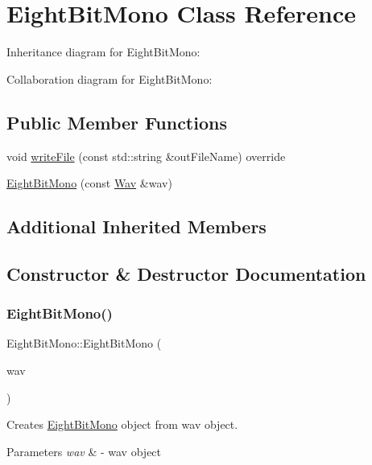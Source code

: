 \hypertarget{classEightBitMono}{}\section{Eight\+Bit\+Mono Class Reference}
\label{classEightBitMono}


Inheritance diagram for Eight\+Bit\+Mono\+:


Collaboration diagram for Eight\+Bit\+Mono\+:
\subsection*{Public Member Functions}
\begin{DoxyCompactItemize}
\item 
void \hyperlink{classEightBitMono_ae654eb1cc4fbb5586b33a73081cfb033}{write\+File} (const std\+::string \&out\+File\+Name) override
\item 
\hyperlink{classEightBitMono_a08f1f216daab7c5c89070c71ef0f4af0}{Eight\+Bit\+Mono} (const \hyperlink{classWav}{Wav} \&wav)
\end{DoxyCompactItemize}
\subsection*{Additional Inherited Members}


\subsection{Constructor \& Destructor Documentation}
\mbox{\label{classEightBitMono_a08f1f216daab7c5c89070c71ef0f4af0}} 
\subsubsection{\texorpdfstring{Eight\+Bit\+Mono()}{EightBitMono()}}
{\footnotesize\ttfamily Eight\+Bit\+Mono\+::\+Eight\+Bit\+Mono (\begin{DoxyParamCaption}\item[{const \hyperlink{classWav}{Wav} \&}]{wav }\end{DoxyParamCaption})}

Creates \hyperlink{classEightBitMono}{Eight\+Bit\+Mono} object from wav object.


\begin{DoxyParams}{Parameters}
{\em wav} & -\/ wav object \\
\hline
\end{DoxyParams}


